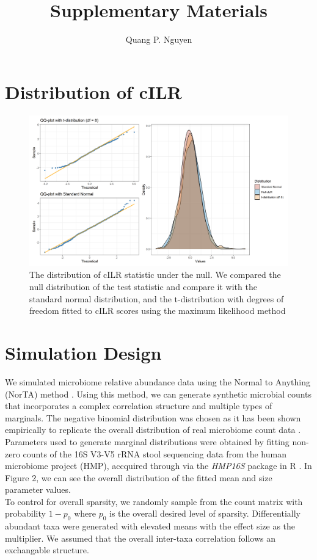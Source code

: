 \documentclass{article}
\author{Quang P. Nguyen}
\title{Supplementary Materials}
\begin{document}
\maketitle
{}

\section{Distribution of cILR}
\begin{figure}[h]
    \centering
    \includegraphics[width=0.8\linewidth]{figures/null_distribution.png}
    \caption{The distribution of cILR statistic under the null. We compared the null distribution of the test statistic and compare it with the standard normal distribution, and the t-distribution with degrees of freedom fitted to cILR scores using the maximum likelihood method}
\end{figure}

\section{Simulation Design}
We simulated microbiome relative abundance data using the Normal to Anything (NorTA) method \cite{cario}. Using this method, we can generate synthetic microbial counts that incorporates a complex correlation structure and multiple types of marginals. The negative binomial distribution was chosen as it has been shown empirically to replicate the overall distribution of real microbiome count data \cite{kurtz2015,calgaro2020}. Parameters used to generate marginal distributions were obtained by fitting non-zero counts of the 16S V3-V5 rRNA stool sequencing data from the human microbiome project (HMP), accquired through via the \emph{HMP16S} package in R \cite{schiffer2019}. In Figure 2, we can see the overall distribution of the fitted mean and size parameter values. \\
To control for overall sparsity, we randomly sample from the count matrix with probability $1 - p_0$ where $p_0$ is the overall desired level of sparsity. Differentially abundant taxa were generated with elevated means with the effect size as the multiplier. We assumed that the overall inter-taxa correlation follows an exchangable structure. \\
\end{document}

